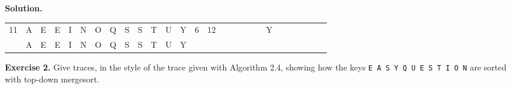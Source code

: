 \documentclass[12pt, a4paper]{article}
\newenvironment{ex}[2][Exercise]
{\par\medskip\noindent \textbf{#1 #2.}}
{\medskip}
\newenvironment{sol}[1][Solution]
{\par\medskip\noindent \textbf{#1.} }
{\medskip}
\begin{document}
\begin{sol}
\begin{center}
{\begin{tabular}{c|cccccccccccc|cc|cccccc|cccccc}
				11 & {\color{gray} A} & {\color{gray}E} & {\color{gray}E} &{\color{gray}I} & {\color{gray}N} & {\color{gray}O} & {\color{gray}Q} & {\color{gray}S} & {\color{gray}S} & {\color{gray}T} & {\color{gray}U} & {\color{red}Y}
				& 6 & 12
				& {} & {} & {} & {} & {} & {\color{red}Y}
				& {} & {} & {} & {} & {} & {} \\
				
				{} & A & E & E & I & N & O & Q & S & S & T & U & Y
				& {} & {}
				& {} & {} & {} & {} & {} & {}
				& {} & {} & {} & {} & {} & {} \\
			\end{tabular}
			}
		\end{center}
	\end{sol}
	\begin{ex}{2}
		Give traces, in the style of the trace given with Algorithm 2.4, showing how the keys
		\texttt{E A S Y Q U E S T I O N} are sorted with top-down mergesort.
	\end{ex}
\end{document}

